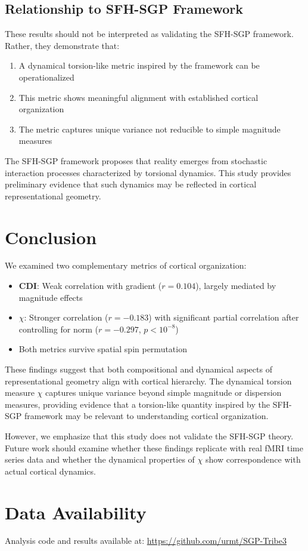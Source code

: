 \documentclass[11pt]{article}
\begin{document}
\subsection{Relationship to SFH-SGP Framework}

These results should not be interpreted as validating the SFH-SGP framework. Rather, they demonstrate that:

\begin{enumerate}
	\item A dynamical torsion-like metric inspired by the framework can be operationalized
	\item This metric shows meaningful alignment with established cortical organization
	\item The metric captures unique variance not reducible to simple magnitude measures
\end{enumerate}

The SFH-SGP framework proposes that reality emerges from stochastic interaction processes characterized by torsional dynamics. This study provides preliminary evidence that such dynamics may be reflected in cortical representational geometry.

\section{Conclusion}

We examined two complementary metrics of cortical organization:

\begin{itemize}
	\item \textbf{CDI}: Weak correlation with gradient ($r = 0.104$), largely mediated by magnitude effects
	\item \textbf{$\chi$}: Stronger correlation ($r = -0.183$) with significant partial correlation after controlling for norm ($r = -0.297$, $p < 10^{-8}$)
	\item Both metrics survive spatial spin permutation
\end{itemize}

These findings suggest that both compositional and dynamical aspects of representational geometry align with cortical hierarchy. The dynamical torsion measure $\chi$ captures unique variance beyond simple magnitude or dispersion measures, providing evidence that a torsion-like quantity inspired by the SFH-SGP framework may be relevant to understanding cortical organization.

However, we emphasize that this study does not validate the SFH-SGP theory. Future work should examine whether these findings replicate with real fMRI time series data and whether the dynamical properties of $\chi$ show correspondence with actual cortical dynamics.

\section*{Data Availability}

Analysis code and results available at: \url{https://github.com/urmt/SGP-Tribe3}



\end{document}
